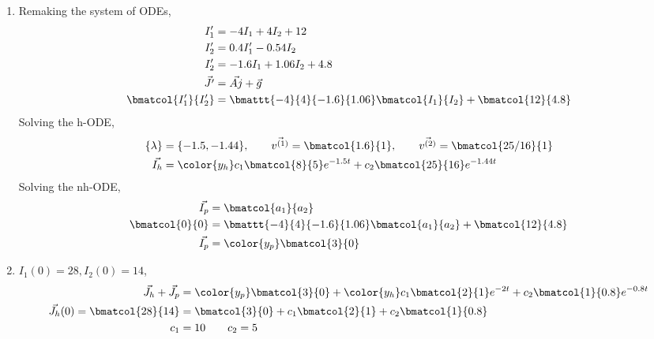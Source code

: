 \begin{enumerate}
    \item Remaking the system of ODEs,
          \begin{align}
              I_1'                 & = -4I_1 + 4I_2 + 12                             \\
              I_2'                 & = 0.4I_1' - 0.54I_2                             \\
              I_2'                 & = -1.6I_1 + 1.06I_2 + 4.8                       \\
              \vec{J'}             & = \vec{Aj} + \vec{g}                            \\
              \bmatcol{I_1'}{I_2'} & = \bmattt{-4}{4}{-1.6}{1.06} \bmatcol{I_1}{I_2}
              + \bmatcol{12}{4.8}                                                    \\
          \end{align}
          Solving the h-ODE,
          \begin{align}
              \{\lambda\} & = \{-1.5, -1.44\}, \qquad \vec{v^{(1)}} = \bmatcol{1.6}{1}
              , \qquad \vec{v^{(2)}} = \bmatcol{25/16}{1}                              \\
              \vec{I_h}   & = \color{y_h} c_1 \bmatcol{8}{5} e^{-1.5t}
              + c_2 \bmatcol{25}{16} e^{-1.44t}
          \end{align}
          Solving the nh-ODE,
          \begin{align}
              \vec{I_p}      & = \bmatcol{a_1}{a_2}                            \\
              \bmatcol{0}{0} & = \bmattt{-4}{4}{-1.6}{1.06} \bmatcol{a_1}{a_2}
              + \bmatcol{12}{4.8}                                              \\
              \vec{I_p}      & = \color{y_p} \bmatcol{3}{0}
          \end{align}

    \item $ I_1 (0) = 28, I_2(0) = 14 $,
          \begin{align}
              \vec{J_h} + \vec{J_p}          & = {\color{y_p} \bmatcol{3}{0}}
              + {\color{y_h} c_1 \bmatcol{2}{1}e^{-2t} + c_2 \bmatcol{1}{0.8}e^{-0.8t}} \\
              \vec{J_h}(0)= \bmatcol{28}{14} & = \bmatcol{3}{0} + c_1\bmatcol{2}{1}
              +  c_2\bmatcol{1}{0.8}                                                    \\
              c_1                            & = 10 \qquad c_2 = 5
          \end{align}


\end{enumerate}
